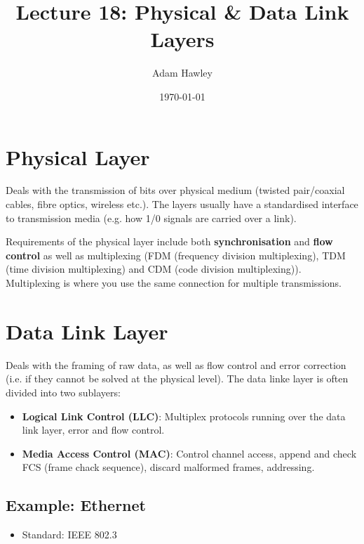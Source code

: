\documentclass[11pt]{article}
\author{Adam Hawley}
\date{\today}
\title{Lecture 18: Physical \& Data Link Layers}
\begin{document}
\maketitle
\tableofcontents


\section{Physical Layer}
\label{sec:org3a6b9a1}
Deals with the transmission of bits over physical medium (twisted pair/coaxial cables, fibre optics, wireless etc.).
The layers usually have a standardised interface to transmission media (e.g. how 1/0 signals are carried over a link).

Requirements of the physical layer include both \textbf{synchronisation} and \textbf{flow control} as well as multiplexing (FDM (frequency division multiplexing), TDM (time division multiplexing) and CDM (code division multiplexing)).
Multiplexing is where you use the same connection for multiple transmissions.

\section{Data Link Layer}
\label{sec:orgc49f324}
Deals with the framing of raw data, as well as flow control and error correction (i.e. if they cannot be solved at the physical level).
The data linke layer is often divided into two sublayers:
\begin{itemize}
\item \textbf{Logical Link Control (LLC)}: Multiplex protocols running over the data link layer, error and flow control.
\item \textbf{Media Access Control (MAC)}: Control channel access, append and check FCS (frame chack sequence), discard malformed frames, addressing.
\end{itemize}

\subsection{Example: Ethernet}
\label{sec:org846e67b}
\begin{itemize}
\item Standard: IEEE 802.3
\end{itemize}
\end{document}
